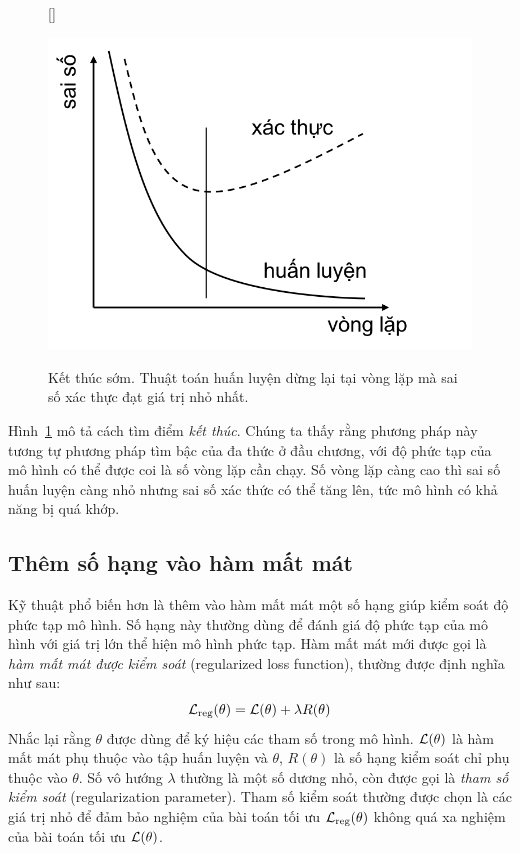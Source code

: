 \begin{figure}[t]
[\FBwidth]
{\caption{
Kết thúc sớm. Thuật toán
huấn luyện dừng lại tại vòng lặp mà sai số xác thực đạt giá trị nhỏ nhất. }
\label{fig:15_earlystopping}}
{ %
\includegraphics[width=.5\textwidth]{Chapters/01_Overview/15_overfitting/earlystopping_1.png}
}
\end{figure}


Hình~\ref{fig:15_earlystopping} mô tả cách tìm điểm \textit{kết thúc}. Chúng ta
thấy rằng phương pháp này tương tự phương pháp tìm bậc của đa thức ở đầu chương,
với độ phức tạp của mô hình có thể được coi là số vòng lặp cần chạy. Số vòng lặp
càng cao thì sai số huấn luyện càng nhỏ nhưng sai số xác thức có thể tăng lên, tức mô hình có khả năng bị quá khớp.


\subsection{Thêm số hạng vào hàm mất mát}
Kỹ thuật phổ biến hơn là thêm vào hàm mất mát một số hạng giúp
kiểm soát độ phức tạp mô hình. Số hạng này thường dùng để đánh giá độ phức tạp của
mô hình với giá trị lớn thể hiện mô hình phức tạp. {Hàm mất mát mới} được
gọi là \textit{hàm mất mát được kiểm soát} (regularized loss function), thường được định nghĩa như sau:
\begin{equation*}
\mathcal{L}_{\text{reg}}(\theta) = \mathcal{L}(\theta) + \lambda R(\theta)
\end{equation*}
Nhắc lại rằng $\theta$ được dùng để ký hiệu các tham số trong mô hình. $\mathcal{L}(\theta)$ là hàm mất mát phụ thuộc vào tập huấn luyện và $\theta$, $R(\theta)$ là số hạng kiểm soát chỉ phụ thuộc vào $\theta$. Số vô hướng $\lambda$ thường là một số dương nhỏ, còn được gọi là \textit{tham số kiểm soát} (regularization parameter).
Tham số kiểm soát thường được chọn là các giá trị nhỏ để đảm bảo nghiệm
của bài toán tối ưu $\mathcal{L}_{\text{reg}}(\theta)$ không quá xa nghiệm của bài toán
tối ưu $\mathcal{L}(\theta)$.

